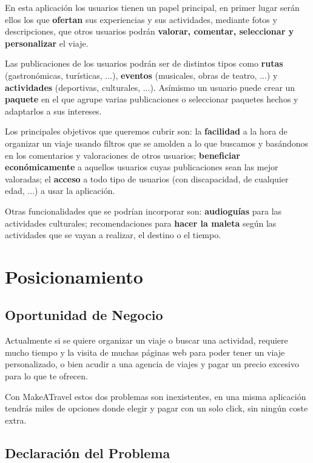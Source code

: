 \documentclass[11pt]{article}
\begin{document}
En esta aplicación los usuarios tienen un papel principal, en primer lugar serán ellos los que \textbf{ofertan} sus experiencias y sus actividades, mediante fotos y descripciones, que otros usuarios podrán \textbf{valorar, comentar, seleccionar y personalizar} el viaje.

Las publicaciones de los usuarios podrán ser de distintos tipos como \textbf{rutas} (gastronómicas, turísticas, ...), \textbf{eventos} (musicales, obras de teatro, ...) y \textbf{actividades} (deportivas, culturales, ...). Asímismo un usuario puede crear un \textbf{paquete} en el que agrupe varias publicaciones o seleccionar paquetes hechos y adaptarlos a sus intereses.

Los principales objetivos que queremos cubrir son: la \textbf{facilidad} a la hora de organizar un viaje usando filtros que se amolden a lo que buscamos y basándonos en los comentarios y valoraciones de otros usuarios; \textbf{beneficiar económicamente} a aquellos usuarios cuyas publicaciones sean las mejor valoradas; el \textbf{acceso} a todo tipo de usuarios (con discapacidad, de cualquier edad, ...) a usar la aplicación.

Otras funcionalidades que se podrían incorporar son: \textbf{audioguías} para las actividades culturales; recomendaciones para \textbf{hacer la maleta} según las actividades que se vayan a realizar, el destino o el tiempo.

\newpage

\section{Posicionamiento}
\subsection{Oportunidad de Negocio}
Actualmente si se quiere organizar un viaje o buscar una actividad,  requiere mucho tiempo y la visita de muchas páginas web para poder tener un viaje personalizado, o bien acudir a una agencia de viajes y pagar un precio excesivo para lo que te ofrecen.

Con MakeATravel estos dos problemas son inexistentes, en una misma aplicación tendrás miles de opciones donde elegir y pagar con un solo click, sin ningún coste extra.

\subsection{Declaración del Problema}
\end{document}
